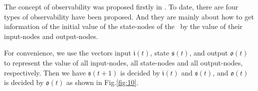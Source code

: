 
The concept of observability was proposed firstly in \cite{cheng2009controllability}. To date, there are four types of observability have been proposed. And they are mainly about how to get  information of the initial value of the state-nodes of the \BCNs\ by the value of their input-nodes and output-nodes. 

For convenience, we use the vectors input $\mathfrak{i}(t)$, state $\mathfrak{s}(t)$, and output $\mathfrak{o}(t)$ to represent the value of all input-nodes, all state-nodes and all output-nodes, respectively. Then we have $\mathfrak{s}(t+1)$ is decided by $\mathfrak{i}(t)$ and $\mathfrak{s}(t)$, and $\mathfrak{o}(t)$ is decided by $\mathfrak{o}(t)$ as shown in Fig.\ref{fig:10}.


